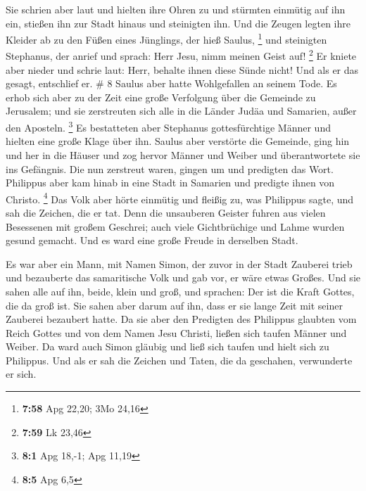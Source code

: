  Sie schrien aber laut und hielten ihre Ohren zu und
stürmten einmütig auf ihn ein, stießen ihn zur Stadt hinaus und
steinigten ihn.  Und die Zeugen legten ihre Kleider ab zu
den Füßen eines Jünglings, der hieß Saulus, \footnote{\textbf{7:58} Apg
  22,20; 3Mo 24,16}  und steinigten Stephanus, der anrief
und sprach: Herr Jesu, nimm meinen Geist auf! \footnote{\textbf{7:59} Lk
  23,46}  Er kniete aber nieder und schrie laut: Herr,
behalte ihnen diese Sünde nicht! Und als er das gesagt, entschlief er.
\# 8  Saulus aber hatte Wohlgefallen an seinem Tode. Es
erhob sich aber zu der Zeit eine große Verfolgung über die Gemeinde zu
Jerusalem; und sie zerstreuten sich alle in die Länder Judäa und
Samarien, außer den Aposteln. \footnote{\textbf{8:1} Apg 18,-1; Apg
  11,19}  Es bestatteten aber Stephanus gottesfürchtige
Männer und hielten eine große Klage über ihn.  Saulus aber
verstörte die Gemeinde, ging hin und her in die Häuser und zog hervor
Männer und Weiber und überantwortete sie ins Gefängnis.  Die
nun zerstreut waren, gingen um und predigten das Wort. 
Philippus aber kam hinab in eine Stadt in Samarien und predigte ihnen
von Christo. \footnote{\textbf{8:5} Apg 6,5}  Das Volk aber
hörte einmütig und fleißig zu, was Philippus sagte, und sah die Zeichen,
die er tat.  Denn die unsauberen Geister fuhren aus vielen
Besessenen mit großem Geschrei; auch viele Gichtbrüchige und Lahme
wurden gesund gemacht.  Und es ward eine große Freude in
derselben Stadt.

 Es war aber ein Mann, mit Namen Simon, der zuvor in der
Stadt Zauberei trieb und bezauberte das samaritische Volk und gab vor,
er wäre etwas Großes.  Und sie sahen alle auf ihn, beide,
klein und groß, und sprachen: Der ist die Kraft Gottes, die da groß ist.
 Sie sahen aber darum auf ihn, dass er sie lange Zeit mit
seiner Zauberei bezaubert hatte.  Da sie aber den Predigten
des Philippus glaubten vom Reich Gottes und von dem Namen Jesu Christi,
ließen sich taufen Männer und Weiber.  Da ward auch Simon
gläubig und ließ sich taufen und hielt sich zu Philippus. Und als er sah
die Zeichen und Taten, die da geschahen, verwunderte er sich.

